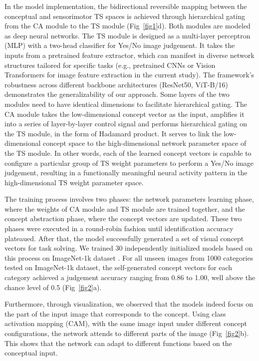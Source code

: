 \documentclass[pdflatex,sn-mathphys-num,lineno]{sn-jnl}%
\begin{document}
\begin{CJK}{UTF8}{gbsn}
In the model implementation, the bidirectional reversible mapping between the conceptual and sensorimotor TS spaces is achieved through hierarchical gating from the CA module to the TS module (Fig~\ref{fig1}d). Both modules are modeled as deep neural networks. The TS module is designed as a multi-layer perceptron (MLP) with a two-head classifier for Yes/No image judgement. It takes the inputs from a pretrained feature extractor, which can manifest in diverse network structures tailored for specific tasks (e.g., pretrained CNNs or Vision Transformers for image feature extraction in the current study). The framework's robustness across different backbone architectures (ResNet50, ViT-B/16) demonstrates the generalizability of our approach. Some layers of the two modules need to have identical dimensions to facilitate hierarchical gating. The CA module takes the low-dimensional concept vector as the input, amplifies it into a series of layer-by-layer control signal and performs hierarchical gating on the TS module, in the form of Hadamard product. It serves to link the low-dimensional concept space to the high-dimensional network parameter space of the TS module. In other words, each of the learned concept vectors is capable to configure a particular group of TS weight parameters to perform a Yes/No image judgement, resulting in a functionally meaningful neural activity pattern in the high-dimensional TS weight parameter space. 

The training process involves two phases: the network parameters learning phase, where the weights of CA module and TS module are trained together, and the concept abstraction phase, where the concept vectors are updated. These two phases were executed in a round-robin fashion until identification accuracy plateaued. After that, the model successfully generated a set of visual concept vectors for task solving. We trained 30 independently initialized models based on this process on ImageNet-1k dataset \cite{deng_imagenet_2009}. For all unseen images from 1000 categories tested on ImageNet-1k dataset, the self-generated concept vectors for each category achieved a judgement accuracy ranging from 0.86 to 1.00, well above the chance level of 0.5 (Fig~\ref{fig2}a).

Furthermore, through visualization, we observed that the models indeed focus on the part of the input image that corresponds to the concept. Using class activation mapping (CAM), with the same image input under different concept configurations, the network attends to different parts of the image (Fig~\ref{fig2}b). This shows that the network can adapt to different functions based on the conceptual input.


\end{CJK}
\end{document}
